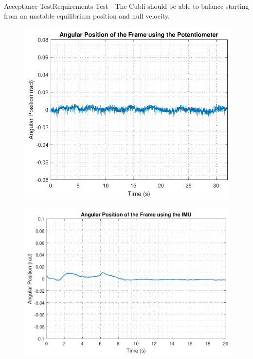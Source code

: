 \begin{frame}{Acceptance Test}{Requirements Test}
- The Cubli should be able to balance starting from an unstable equilibrium position and null velocity.\linebreak

\begin{minipage}{\linewidth}
	\begin{minipage}{0.45\linewidth}
		\begin{figure}[H]
			\centering
			\includegraphics[scale=.345]{Pictures/testReq1}
		\end{figure}
	\end{minipage}
	\hspace{0.03\linewidth}
	\begin{minipage}{0.45\linewidth}
		\begin{figure}[H]\vspace{0mm}
			\centering
			\includegraphics[scale=.345]{Pictures/testReq1_IMU}
		\end{figure}
	\end{minipage}
\end{minipage}\linebreak


\end{frame}
